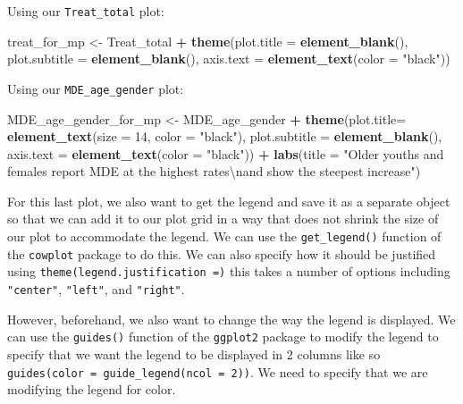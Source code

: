 \documentclass[
]{article}
\newenvironment{Shaded}{\begin{snugshade}}{\end{snugshade}}
\newcommand{\CharTok}[1]{\textcolor[rgb]{0.31,0.60,0.02}{#1}}
\newcommand{\DataTypeTok}[1]{\textcolor[rgb]{0.13,0.29,0.53}{#1}}
\newcommand{\DecValTok}[1]{\textcolor[rgb]{0.00,0.00,0.81}{#1}}
\newcommand{\KeywordTok}[1]{\textcolor[rgb]{0.13,0.29,0.53}{\textbf{#1}}}
\newcommand{\NormalTok}[1]{#1}
\newcommand{\OperatorTok}[1]{\textcolor[rgb]{0.81,0.36,0.00}{\textbf{#1}}}
\newcommand{\StringTok}[1]{\textcolor[rgb]{0.31,0.60,0.02}{#1}}
\begin{document}
Using our \texttt{Treat\_total} plot:

\begin{Shaded}
\begin{Highlighting}[]
\NormalTok{treat_for_mp <-}\StringTok{ }
\StringTok{  }\NormalTok{Treat_total }\OperatorTok{+}
\StringTok{  }\KeywordTok{theme}\NormalTok{(}\DataTypeTok{plot.title =} \KeywordTok{element_blank}\NormalTok{(),}
        \DataTypeTok{plot.subtitle =} \KeywordTok{element_blank}\NormalTok{(),}
        \DataTypeTok{axis.text =} \KeywordTok{element_text}\NormalTok{(}\DataTypeTok{color =} \StringTok{"black"}\NormalTok{))}
\end{Highlighting}
\end{Shaded}

Using our \texttt{MDE\_age\_gender} plot:

\begin{Shaded}
\begin{Highlighting}[]
\NormalTok{MDE_age_gender_for_mp <-}\StringTok{ }
\StringTok{  }\NormalTok{MDE_age_gender }\OperatorTok{+}
\StringTok{  }\KeywordTok{theme}\NormalTok{(}\DataTypeTok{plot.title=} \KeywordTok{element_text}\NormalTok{(}\DataTypeTok{size =} \DecValTok{14}\NormalTok{, }\DataTypeTok{color =} \StringTok{"black"}\NormalTok{),}
        \DataTypeTok{plot.subtitle =} \KeywordTok{element_blank}\NormalTok{(),}
        \DataTypeTok{axis.text =} \KeywordTok{element_text}\NormalTok{(}\DataTypeTok{color =} \StringTok{"black"}\NormalTok{)) }\OperatorTok{+}
\StringTok{  }\KeywordTok{labs}\NormalTok{(}\DataTypeTok{title =} \StringTok{"Older youths and females report MDE at the highest rates}\CharTok{\textbackslash{}n}\StringTok{and show the steepest increase"}\NormalTok{) }
\end{Highlighting}
\end{Shaded}

For this last plot, we also want to get the legend and save it as a
separate object so that we can add it to our plot grid in a way that
does not shrink the size of our plot to accommodate the legend. We can
use the \texttt{get\_legend()} function of the \texttt{cowplot} package
to do this. We can also specify how it should be justified using
\texttt{theme(legend.justification\ =)} this takes a number of options
including \texttt{"center"}, \texttt{"left"}, and \texttt{"right"}.

However, beforehand, we also want to change the way the legend is
displayed. We can use the \texttt{guides()} function of the
\texttt{ggplot2} package to modify the legend to specify that we want
the legend to be displayed in 2 columns like so
\texttt{guides(color\ =\ guide\_legend(ncol\ =\ 2))}. We need to specify
that we are modifying the legend for color.
\end{document}
